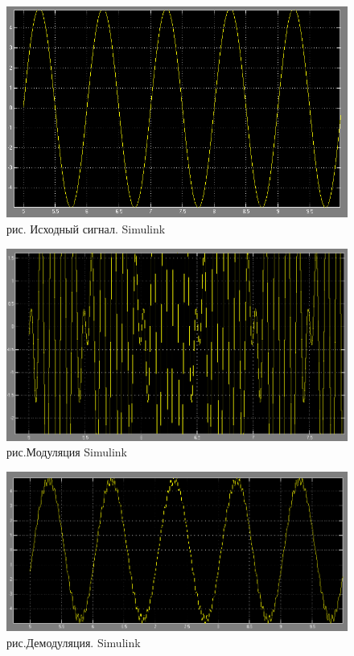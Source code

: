 \documentclass[10pt,a4paper]{report}
\begin{document}
\begin{figure}
\begin{center}
\includegraphics[angle=0, scale = 0.6]{7_11.png}\newline
рис. Исходный сигнал. Simulink\newline
\end{center}
\end{figure}
\begin{figure}
\begin{center}
\includegraphics[angle=0, scale = 0.6]{7_12.png}\newline
рис.Модуляция Simulink\newline
\end{center}
\end{figure}
\begin{figure}
\begin{center}
\includegraphics[angle=0, scale = 0.6]{7_13.png}\newline
рис.Демодуляция. Simulink\newline
\end{center}
\end{figure}
\end{document}
